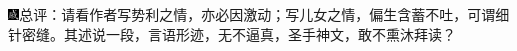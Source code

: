 {\includegraphics[width=3mm]{../Images/00005}\kaishu 总评：请看作者写势利之情，亦必因激动；写儿女之情，偏生含蓄不吐，可谓细针密缝。其述说一段，言语形迹，无不逼真，圣手神文，敢不熏沐拜读？}

%
